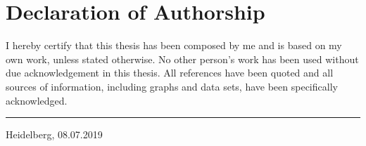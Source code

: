 \makeatletter
{}
\chapter*{Declaration of Authorship}
I hereby certify that this thesis has been composed by me and is based on my own work, unless stated otherwise. No other person’s work has been used without due acknowledgement in this thesis. All references have been quoted and all sources of information, including graphs and data sets, have been specifically acknowledged.

\vspace{20mm} 

\hspace{80mm} \rule{60mm}{.15mm} \par
\hspace{80mm} \@author \par
\vspace{3mm}
\hspace{80mm} Heidelberg, 08.07.2019 
\makeatother
